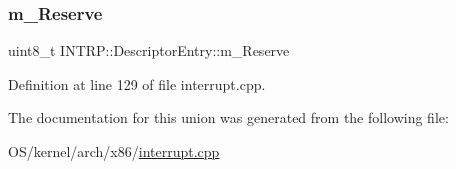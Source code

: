 \subsubsection{\texorpdfstring{m\+\_\+\+Reserve}{m\_Reserve}}
{\footnotesize\ttfamily uint8\+\_\+t I\+N\+T\+R\+P\+::\+Descriptor\+Entry\+::m\+\_\+\+Reserve}



Definition at line 129 of file interrupt.\+cpp.



The documentation for this union was generated from the following file\+:\begin{DoxyCompactItemize}
\item 
O\+S/kernel/arch/x86/\hyperlink{interrupt_8cpp}{interrupt.\+cpp}\end{DoxyCompactItemize}
